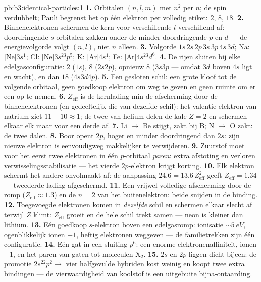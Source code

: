\begin{solution}{pb:b3:identical-particles:1}
\textbf{1.} Orbitalen $(n, l, m)$ met $n^2$ per $n$; de spin verdubbelt;
Pauli begrenst het op één elektron per volledig etiket: $2$, $8$, $18$.
\textbf{2.} Binnenelektronen schermen de kern voor verschillende $l$
verschillend af: doordringende $s$-orbitalen zakken onder de minder
doordringende $p$ en $d$ --- de energievolgorde volgt $(n, l)$, niet $n$
alleen.
\textbf{3.} Volgorde $1s\,2s\,2p\,3s\,3p\,4s\,3d$; Na: [Ne]$3s^1$;
Cl: [Ne]$3s^23p^5$; K: [Ar]$4s^1$; Fe: [Ar]$4s^23d^6$.
\textbf{4.} De rijen sluiten bij elke edelgasconfiguratie: $2$ ($1s$),
$8$ ($2s2p$), opnieuw $8$ ($3s3p$ --- omdat $3d$ boven $4s$ ligt en
wacht), en dan $18$ ($4s3d4p$).
\textbf{5.} Een gesloten schil: een grote kloof tot de volgende orbitaal,
geen goedkoop elektron om weg te geven en geen ruimte om er een op te
nemen.
\textbf{6.} $Z_{\text{eff}}$ is de kernlading min de afscherming door de
binnenelektronen (en gedeeltelijk die van dezelfde schil): het
valentie-elektron van natrium ziet $11 - 10 \approx 1$; de twee van helium
delen de kale $Z = 2$ en schermen elkaar elk maar voor een derde af.
\textbf{7.} Li $\to$ Be stijgt, zakt bij B; N $\to$ O zakt: de twee dalen.
\textbf{8.} Boor opent $2p$, hoger en minder doordringend dan $2s$: zijn
nieuwe elektron is eenvoudigweg makkelijker te verwijderen.
\textbf{9.} Zuurstof moet voor het eerst twee elektronen in één
$p$-orbitaal \emph{paren}: extra afstoting en verloren
verwisselingsstabilisatie --- het vierde $2p$-elektron krijgt korting.
\textbf{10.} Elk elektron schermt het andere onvolmaakt af: de aanpassing
$24.6 = 13.6\,Z_{\text{eff}}^2$ geeft $Z_{\text{eff}} =
1.34$ ---
tweederde lading afgeschermd.
\textbf{11.} Een vrijwel volledige afscherming door de romp
($Z_{\text{eff}}
\approx 1.3$) en de $n = 2$ van het buitenelektron: beide
snijden in de binding.
\textbf{12.} Toegevoegde elektronen komen in \emph{dezelfde} schil en
schermen elkaar slecht af terwijl $Z$ klimt: $Z_{\text{eff}}$ groeit en de
hele schil trekt samen --- neon is kleiner dan lithium.
\textbf{13.} Eén goedkoop $s$-elektron boven een edelgasromp: ionisatie
$\sim\qty{5}{eV}$, ogenblikkelijk ionen $+1$, heftig elektronen weggeven
--- de familietrekken zijn één configuratie.
\textbf{14.} Eén gat in een sluiting $p^6$: een enorme
elektronenaffiniteit, ionen $-1$, en het paren van gaten tot moleculen
X$_2$.
\textbf{15.} $2s$ en $2p$ liggen dicht bijeen: de promotie $2s^22p^2 \to$
vier halfgevulde hybriden kost weinig en koopt twee extra bindingen --- de
vierwaardigheid van koolstof is een uitgebuite bijna-ontaarding.

\end{solution}
